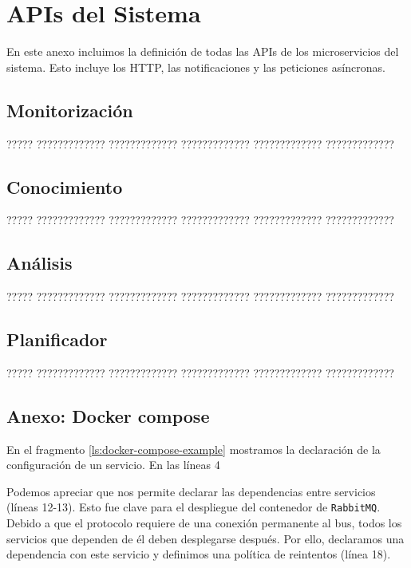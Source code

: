 \chapter{APIs del Sistema}
\label{anx:apis}

En este anexo incluimos la definición de todas las APIs de los microservicios del sistema. Esto incluye los  HTTP, las notificaciones y las peticiones asíncronas.

\section{Monitorización}

????? ????????????? ????????????? ????????????? ????????????? ?????????????

\section{Conocimiento}

????? ????????????? ????????????? ????????????? ????????????? ?????????????

\section{Análisis}

????? ????????????? ????????????? ????????????? ????????????? ?????????????

\section{Planificador}

????? ????????????? ????????????? ????????????? ????????????? ?????????????

\section{Anexo: Docker compose}

En el fragmento \ref{ls:docker-compose-example} mostramos la declaración de la configuración de un servicio. En las líneas 4

Podemos apreciar que nos permite declarar las dependencias entre servicios (líneas 12-13). Esto fue clave para el despliegue del contenedor de \texttt{RabbitMQ}. Debido a que el protocolo requiere de una conexión permanente al bus\cite{johanssonPartRabbitMQBest2019}, todos los servicios que dependen de él deben desplegarse después. Por ello, declaramos una dependencia con este servicio y definimos una política de reintentos (línea 18).


